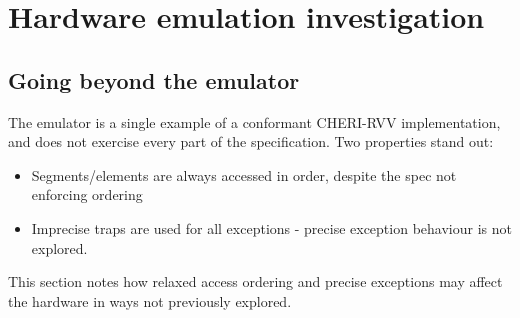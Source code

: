 \chapter{Hardware emulation investigation}




% 
% 

\section{Going beyond the emulator}
The emulator is a single example of a conformant CHERI-RVV implementation, and does not exercise every part of the specification.
Two properties stand out:
\begin{itemize}
    \item Segments/elements are always accessed in order, despite the spec not enforcing ordering
    \item Imprecise traps are used for all exceptions - precise exception behaviour is not explored.
\end{itemize}
This section notes how relaxed access ordering and precise exceptions may affect the hardware in ways not previously explored.


